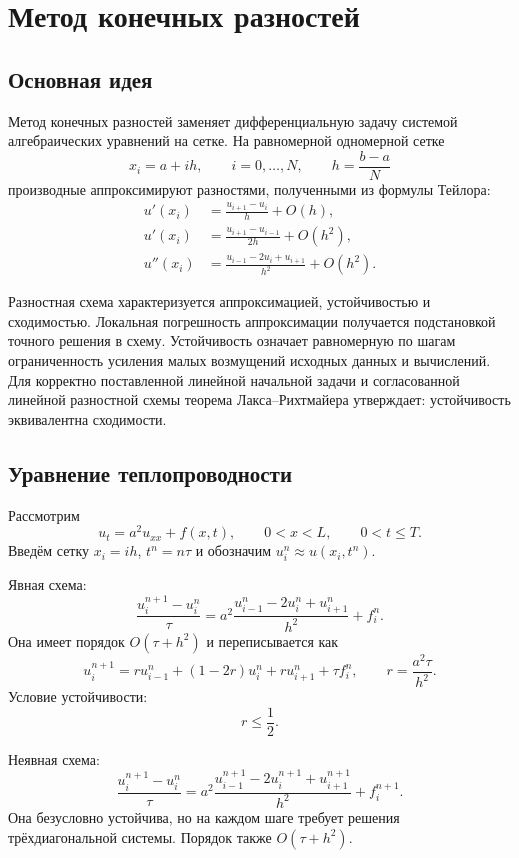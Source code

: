 \section{Метод конечных разностей}
\label{sec:finite-difference-method}

\subsection{Основная идея}

Метод конечных разностей заменяет дифференциальную задачу системой алгебраических
уравнений на сетке. На равномерной одномерной сетке
\[
    x_i=a+ih,
    \qquad i=0,\ldots,N,
    \qquad h=\frac{b-a}{N}
\]
производные аппроксимируют разностями, полученными из формулы Тейлора:
\[
\begin{aligned}
 u'(x_i)&=\frac{u_{i+1}-u_i}{h}+O(h),\\
 u'(x_i)&=\frac{u_{i+1}-u_{i-1}}{2h}+O(h^2),\\
 u''(x_i)&=\frac{u_{i-1}-2u_i+u_{i+1}}{h^2}+O(h^2).
\end{aligned}
\]

Разностная схема характеризуется аппроксимацией, устойчивостью и сходимостью.
Локальная погрешность аппроксимации получается подстановкой точного решения в
схему. Устойчивость означает равномерную по шагам ограниченность усиления малых
возмущений исходных данных и вычислений. Для корректно поставленной линейной
начальной задачи и согласованной линейной разностной схемы теорема
Лакса--Рихтмайера утверждает: устойчивость эквивалентна сходимости.

\subsection{Уравнение теплопроводности}

Рассмотрим
\[
    u_t=a^2u_{xx}+f(x,t),
    \qquad 0<x<L,
    \qquad 0<t\leq T.
\]
Введём сетку $x_i=ih$, $t^n=n\tau$ и обозначим
$u_i^n\approx u(x_i,t^n)$.

Явная схема:
\[
    \frac{u_i^{n+1}-u_i^n}{\tau}
    =a^2\frac{u_{i-1}^n-2u_i^n+u_{i+1}^n}{h^2}+f_i^n.
\]
Она имеет порядок $O(\tau+h^2)$ и переписывается как
\[
    u_i^{n+1}
    =r u_{i-1}^n+(1-2r)u_i^n+r u_{i+1}^n+\tau f_i^n,
    \qquad
    r=\frac{a^2\tau}{h^2}.
\]
Условие устойчивости:
\[
    r\leq\frac12.
\]

Неявная схема:
\[
    \frac{u_i^{n+1}-u_i^n}{\tau}
    =a^2\frac{u_{i-1}^{n+1}-2u_i^{n+1}+u_{i+1}^{n+1}}{h^2}+f_i^{n+1}.
\]
Она безусловно устойчива, но на каждом шаге требует решения трёхдиагональной
системы. Порядок также $O(\tau+h^2)$.

